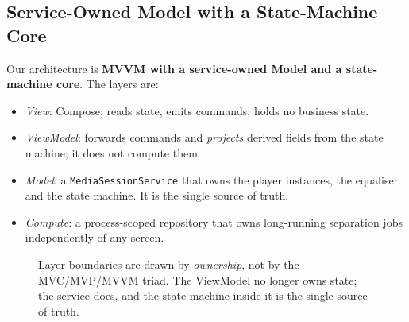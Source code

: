 \documentclass[letterpaper]{article} %
\begin{document}
\subsection{Service-Owned Model with a State-Machine Core}

Our architecture is \textbf{MVVM with a service-owned Model and a state-machine
core}. The layers are:

\begin{itemize}
\item \emph{View}: Compose; reads state, emits commands; holds no business state.
\item \emph{ViewModel}: forwards commands and \emph{projects} derived fields from
the state machine; it does not compute them.
\item \emph{Model}: a \texttt{MediaSessionService} that owns the player
instances, the equaliser and the state machine. It is the single source of truth.
\item \emph{Compute}: a process-scoped repository that owns long-running
separation jobs independently of any screen.
\end{itemize}

\begin{figure}[t]
\centering
{}
\caption{Layer boundaries are drawn by \emph{ownership}, not by the
MVC/MVP/MVVM triad. The ViewModel no longer owns state; the service does, and
the state machine inside it is the single source of truth.}
\label{fig:arch}
\end{figure}
\end{document}
